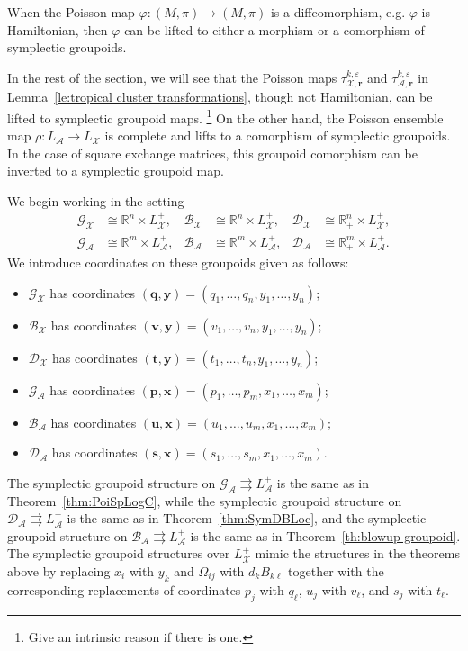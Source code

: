 \documentclass{amsart}
\numberwithin{equation}{section}
\newcommand{\bfp}{{\boldsymbol{p}}}
\newcommand{\bfq}{{\boldsymbol{q}}}
\newcommand{\bfr}{{\boldsymbol{r}}}
\newcommand{\bfs}{{\boldsymbol{s}}}
\newcommand{\bft}{{\boldsymbol{t}}}
\newcommand{\bfu}{{\boldsymbol{u}}}
\newcommand{\bfv}{{\boldsymbol{v}}}
\newcommand{\bfx}{{\boldsymbol{x}}}
\newcommand{\bfy}{{\boldsymbol{y}}}
\newcommand{\cA}{\mathcal{A}}
\newcommand{\cB}{\mathcal{B}}
\newcommand{\cD}{\mathcal{D}}
\newcommand{\cG}{\mathcal{G}}
\newcommand{\cX}{\mathcal{X}}
\newcommand{\RR}{\mathbb{R}}
\newcommand{\rra}{\rightrightarrows}
\begin{document}
When the Poisson map $\varphi: (M, \pi) \to (M, \pi)$ is a diffeomorphism, e.g. $\varphi$ is Hamiltonian, then $\varphi$ can be lifted to either a morphism or a comorphism of symplectic groupoids.

In the rest of the section, we will see that the Poisson maps $\tau_{\cX,\bfr}^{k,\varepsilon}$ and $\tau_{\cA,\bfr}^{k,\varepsilon}$ in Lemma~\ref{le:tropical cluster transformations}, though not Hamiltonian, can be lifted to symplectic groupoid maps. \footnote{Give an intrinsic reason if there is one.} On the other hand, the Poisson ensemble map $\rho:L_\cA\to L_\cX$ is complete and lifts to a comorphism of symplectic groupoids. In the case of square exchange matrices, this groupoid comorphism can be inverted to a symplectic groupoid map.

We begin working in the setting 
\begin{align*}
  \cG_\cX&\cong\RR^n\times L^+_\cX,& \cB_\cX&\cong\RR^n\times L^+_\cX,& \cD_\cX&\cong\RR_+^n\times L^+_\cX,\\
  \cG_\cA&\cong\RR^m\times L^+_\cA,& \cB_\cA&\cong\RR^m\times L^+_\cA,& \cD_\cA&\cong\RR_+^m\times L^+_\cA.
\end{align*}
We introduce coordinates on these groupoids given as follows:
\begin{itemize}
  \item $\cG_\cX$ has coordinates $(\bfq,\bfy)=(q_1,\ldots,q_n,y_1,\ldots,y_n)$; 
  \item $\cB_\cX$ has coordinates $(\bfv,\bfy)=(v_1,\ldots,v_n,y_1,\ldots,y_n)$;
  \item $\cD_\cX$ has coordinates $(\bft,\bfy)=(t_1,\ldots,t_n,y_1,\ldots,y_n)$; 
  \item $\cG_\cA$ has coordinates $(\bfp,\bfx)=(p_1,\ldots,p_m,x_1,\ldots,x_m)$; 
  \item $\cB_\cA$ has coordinates $(\bfu,\bfx)=(u_1,\ldots,u_m,x_1,\ldots,x_m)$;
  \item $\cD_\cA$ has coordinates $(\bfs,\bfx)=(s_1,\ldots,s_m,x_1,\ldots,x_m)$.
\end{itemize}
The symplectic groupoid structure on $\cG_\cA \rra L^+_\cA$ is the same as in Theorem~\ref{thm:PoiSpLogC}, while the symplectic groupoid structure on $\cD_\cA \rra L^+_\cA$ is the same as in Theorem~\ref{thm:SymDBLoc}, and the symplectic groupoid structure on $\cB_\cA \rra L^+_\cA$ is the same as in Theorem~\ref{th:blowup groupoid}.
The symplectic groupoid structures over $L^+_\cX$ mimic the structures in the theorems above by replacing $x_i$ with $y_k$ and $\Omega_{ij}$ with $d_kB_{k\ell}$ together with the corresponding replacements of coordinates $p_j$ with $q_\ell$, $u_j$ with $v_\ell$, and $s_j$ with $t_\ell$.
\end{document}

